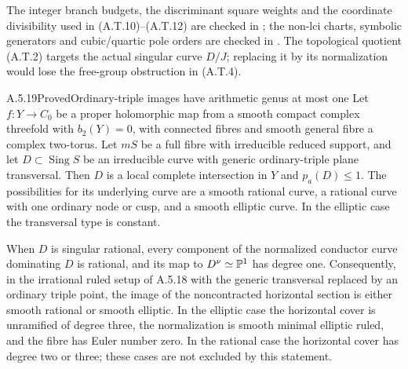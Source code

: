 The integer branch budgets, the discriminant square
weights and the coordinate divisibility used in
(A.T.10)--(A.T.12) are checked in
; the non-lci charts,
symbolic generators and cubic/quartic pole orders
are checked in .
The topological
quotient (A.T.2) targets the actual singular curve
$D/J$; replacing it by its normalization would
lose the free-group obstruction in (A.T.4).



\begin{statement}{A.5.19}{Proved}{Ordinary-triple images have arithmetic genus at most one}
Let $f:Y\to C_0$ be a proper holomorphic map from a smooth
compact complex threefold with $b_2(Y)=0$, with connected
fibres and smooth general fibre a complex two-torus.
Let $mS$ be a full fibre with irreducible reduced support,
and let $D\subset\operatorname{Sing}S$ be an irreducible
curve with generic ordinary-triple plane transversal.
Then $D$ is a local complete intersection in $Y$ and
$p_a(D)\le1$. The possibilities for its underlying curve
are a smooth rational curve, a rational curve with one
ordinary node or cusp, and a smooth elliptic curve.
In the elliptic case the transversal type is constant.

When $D$ is singular rational, every component of the
normalized conductor curve dominating $D$ is rational,
and its map to $D^\nu\simeq\mathbb P^1$ has degree one.
Consequently, in the irrational ruled setup of A.5.18
with the generic transversal replaced by an ordinary
triple point, the image of the noncontracted horizontal
section is either smooth rational or smooth elliptic.
In the elliptic case the horizontal cover is unramified
of degree three, the normalization is smooth minimal
elliptic ruled, and the fibre has Euler number zero.
In the rational case the horizontal cover has degree
two or three; these cases are not excluded by this
statement.
\end{statement}
